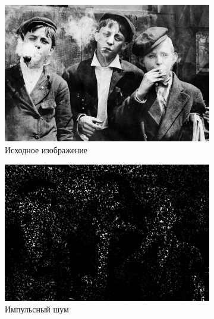 \begin{figure}[ht!] 
    \centering
    \begin{subfigure}[b]{0.5\linewidth}
        \centering
        \includegraphics[width=0.95\linewidth]{../lewis-hine-taschen-main-3.jpg} 
        \caption{Исходное изображение} 
        \label{rang_5_1:a} 
        \vspace{4ex}
    \end{subfigure}%
    \begin{subfigure}[b]{0.5\linewidth}
      \centering
      \includegraphics[width=0.95\linewidth]{../Rang_Filter/Rang_Impulse_noise_(k=5,r=1).jpg} 
      \caption{Импульсный шум} 
      \label{rang_5_1:b} 
      \vspace{4ex}
    \end{subfigure}
    \begin{subfigure}[b]{0.5\linewidth}
      \centering

\end{subfigure}
\end{figure}

